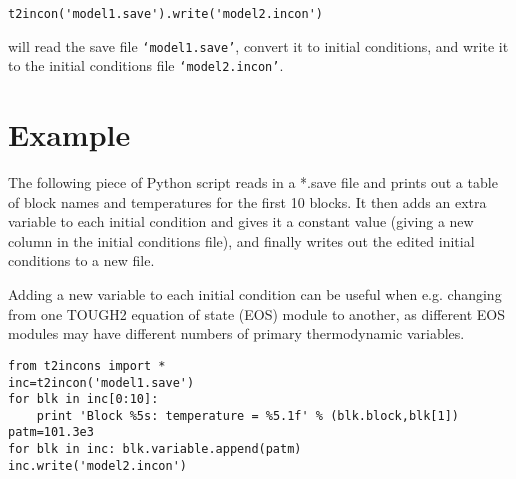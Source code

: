 \begin{verbatim}
t2incon('model1.save').write('model2.incon')
\end{verbatim}

will read the save file \texttt{`model1.save'}, convert it to initial conditions, and write it to the initial conditions file \texttt{`model2.incon'}.

\section{Example}

The following piece of Python script reads in a *.save file and prints out a table of block names and temperatures for the first 10 blocks.  It then adds an extra variable to each initial condition and gives it a constant value (giving a new column in the initial conditions file), and finally writes out the edited initial conditions to a new file.

Adding a new variable to each initial condition can be useful when e.g. changing from one TOUGH2 equation of state (EOS) module to another, as different EOS modules may have different numbers of primary thermodynamic variables.

\begin{verbatim}
from t2incons import *
inc=t2incon('model1.save')
for blk in inc[0:10]:
    print 'Block %5s: temperature = %5.1f' % (blk.block,blk[1])
patm=101.3e3
for blk in inc: blk.variable.append(patm)
inc.write('model2.incon')

\end{verbatim}

